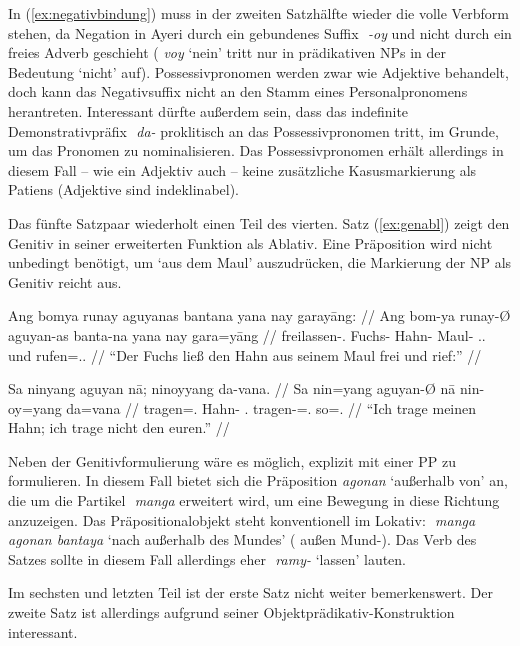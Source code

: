\documentclass[12pt,paper=a4]{scrartcl}
\newcommand{\TsgM}{{\Tsg}.{\M}}
\newcommand{\zwsp}{\mbox{​}} %
\newcommand{\rayr}[2]{\zwsp\smash{{\Tagati #1}} \emph{#2}} %
\newcommand{\xayr}[3]{\zwsp\smash{\Tagati #1} \emph{#2} `#3'} %
\begin{document}
In (\ref{ex:negativbindung}) muss in der zweiten Satzhälfte wieder die volle Verbform stehen, da Negation in Ayeri durch ein gebundenes Suffix \rayr{/Oj}{-oy} und nicht durch ein freies Adverb geschieht (\xayr{voj}{voy}{nein} tritt nur in prädikativen NPs in der Bedeutung `nicht' auf). Possessivpronomen werden zwar wie Adjektive behandelt, doch kann das Negativsuffix nicht an den Stamm eines Personalpronomens herantreten. Interessant dürfte außerdem sein, dass das indefinite Demonstrativpräfix \rayr{d/}{da-} proklitisch an das Possessivpronomen tritt, im Grunde, um das Pronomen zu nominalisieren. Das Possessivpronomen erhält allerdings in diesem Fall -- wie ein Adjektiv auch -- keine zusätzliche Kasusmarkierung als Patiens (Adjektive sind indeklinabel).

Das fünfte Satzpaar wiederholt einen Teil des vierten. Satz (\ref{ex:genabl}) zeigt den Genitiv in seiner erweiterten Funktion als Ablativ. Eine Präposition wird nicht unbedingt benötigt, um `aus dem Maul' auszudrücken, die Markierung der NP als Genitiv reicht aus.

\pex %
\a\label{ex:genabl}\begingl
	\gla Ang bomya runay aguyanas bantana yana nay garayāng: //
	\glb Ang bom-ya runay-Ø aguyan-as banta-na yana nay gara=yāng //
	\glc \AgtT{} freilassen-\TsgM{} Fuchs-\Top{} Hahn-\Parg{} Maul-\Gen{} \TsgM{}.\Gen{} und rufen=\TsgM{}.\Aarg{} //
	\glft \enquote{Der Fuchs ließ den Hahn aus seinem Maul frei und rief:} //
\endgl

\a\begingl
	\gla Sa ninyang aguyan nā; ninoyyang da-vana. //
	\glb Sa nin=yang aguyan-Ø nā nin-oy=yang da=vana //
	\glc \PatT{} tragen=\Fsg{}.\Aarg{} Hahn-\Top{} \Fsg{}.\Gen{} tragen-\Neg{}=\Fsg{}.\Aarg{} so=\Spl{}.\Gen{} //
	\glft \enquote{Ich trage meinen Hahn; ich trage nicht den euren.} //
\endgl

\xe

Neben der Genitivformulierung wäre es möglich, explizit mit einer PP zu formulieren. In diesem Fall bietet sich die Präposition \xayr{AgonnF}{agonan}{außerhalb von} an, die um die Partikel \rayr{mN}{manga} erweitert wird, um eine Bewegung in diese Richtung anzuzeigen. Das Präpositionalobjekt steht konventionell im Lokativ: \xayr{mN AgonnF bMty}{manga agonan bantaya}{nach außerhalb des Mundes} (\Dyn{} außen Mund-\Loc{}). Das Verb des Satzes sollte in diesem Fall allerdings eher \xayr{rmYF/}{ramy-}{lassen} lauten.

Im sechsten und letzten Teil ist der erste Satz nicht weiter bemerkenswert. Der zweite Satz ist allerdings aufgrund seiner Objektprädikativ-Konstruktion interessant.
\end{document}
